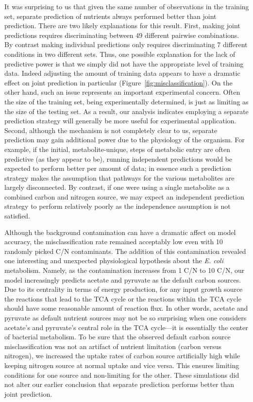 \documentclass[12pt]{article}
\begin{document}
It was surprising to us that given the same number of observations in the training set, separate prediction of nutrients always performed better than joint prediction. There are two likely explanations for this result. First, making joint predictions requires discriminating between 49 different pairwise combinations. By contrast making individual predictions only requires discriminating 7 different conditions in two different sets. Thus, one possible explanation for the lack of predictive power is that we simply did not have the appropriate level of training data. Indeed adjusting the amount of training data appears to have a dramatic effect on joint prediction in particular (Figure~\ref{fig:misclassification}). On the other hand, such an issue represents an important experimental concern. Often the size of the training set, being experimentally determined, is just as limiting as the size of the testing set. As a result, our analysis indicates employing a separate prediction strategy will generally be more useful for experimental application. Second, although the mechanism is not completely clear to us, separate prediction may gain additional power due to the physiology of the organism. For example, if the initial, metabolite-unique, steps of metabolic entry are often predictive (as they appear to be), running independent predictions would be expected to perform better per amount of data; in essence such a prediction strategy makes the assumption that pathways for the various metabolites are largely disconnected. By contrast, if one were using a single metabolite as a combined carbon and nitrogen source, we may expect an independent prediction strategy to perform relatively poorly as the independence assumption is not satisfied.

Although the background contamination can have a dramatic affect on model accuracy, the misclassification rate remained acceptably low even with 10 randomly picked C/N contaminants. The addition of this contamination revealed one interesting and unexpected physiological hypothesis about the \emph{E. coli} metabolism. Namely, as the contamination increases from 1 C/N to 10 C/N, our model increasingly predicts acetate and pyruvate as the default carbon sources. Due to its centrality in terms of energy production, for any input growth source the reactions that lead to the TCA cycle or the reactions within the TCA cycle should have some reasonable amount of reaction flux. In other words, acetate and pyruvate as default nutrient sources may not be so surprising when one considers acetate's and pyruvate's central role in the TCA cycle---it is essentially the center of bacterial metabolism. To be sure that the observed default carbon source misclassification was not an artifact of nutrient limitation (carbon versus nitrogen), we increased the uptake rates of carbon source artificially high while keeping nitrogen source at normal uptake and vice versa. This ensures limiting conditions for one source and non-limiting for the other. These simulations did not alter our earlier conclusion that separate prediction performs better than joint prediction.
\end{document}
